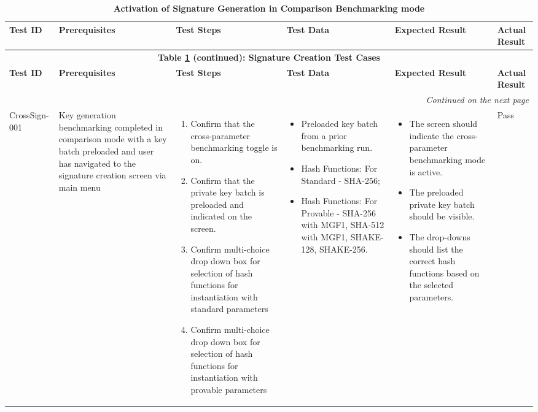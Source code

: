 \documentclass[]{final_report}
\theoremstyle{definition}
\begin{document}
\begin{longtable}{|l|p{2.5cm}|p{2.8cm}|p{3.5cm}|p{3cm}|p{1.3cm}|}
  \caption{\textbf{Activation of Signature Generation in Comparison Benchmarking mode}} 
  \label{tab:signature_creation} \\
  \hline
  \textbf{Test ID} & \textbf{Prerequisites} & \textbf{Test Steps} & \textbf{Test Data} & \textbf{Expected Result} & \textbf{Actual Result} \\
  \hline
  \endfirsthead

  \multicolumn{6}{c}{\textbf{Table \ref{tab:signature_creation} (continued): Signature Creation Test Cases}} \\
  \hline
  \textbf{Test ID} & \textbf{Prerequisites} & \textbf{Test Steps} & \textbf{Test Data} & \textbf{Expected Result} & \textbf{Actual Result} \\
  \hline
  \endhead

  \hline
  \multicolumn{6}{r}{\textit{Continued on the next page}} \\
  \endfoot

  \hline
  \endlastfoot

CrossSign-001 & Key generation benchmarking completed in comparison mode with a key batch preloaded and user has navigated to the signature creation screen via main menu &
\begin{enumerate}
\item Confirm that the cross-parameter benchmarking toggle is on.
\item Confirm that the private key batch is preloaded and indicated on the screen.
\item Confirm multi-choice drop down box for selection of hash functions for instantiation with standard parameters
\item Confirm multi-choice drop down box for selection of hash functions for instantiation with provable parameters
\end{enumerate} &
\begin{itemize}
\item Preloaded key batch from a prior benchmarking run.
\item Hash Functions: For Standard - SHA-256; 
\item Hash Functions: For Provable - SHA-256 with MGF1, SHA-512 with MGF1, SHAKE-128, SHAKE-256.
\end{itemize} &
\begin{itemize}
\item The screen should indicate the cross-parameter benchmarking mode is active.
\item The preloaded private key batch should be visible.
\item The drop-downs should list the correct hash functions based on the selected parameters.
\end{itemize} &Pass \\
\hline
  
\end{longtable}
\end{document}
